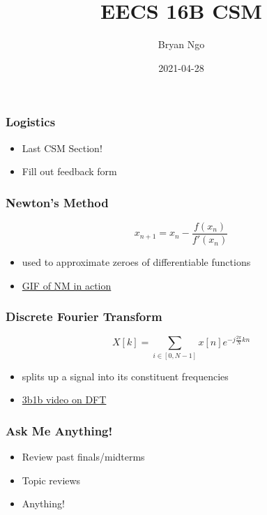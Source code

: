 \documentclass[aspectratio=169]{beamer}
\title{EECS 16B CSM}
\author{Bryan Ngo}
\date{2021-04-28}
\institute{UC Berkeley}
\begin{document}
\begin{frame}
    \maketitle
\end{frame}

\begin{frame}
    \frametitle{Logistics}

    \begin{itemize}
        \item Last CSM Section!
        \item Fill out feedback form
    \end{itemize}
\end{frame}

\begin{frame}
    \frametitle{Newton's Method}

    \begin{equation}
        x_{n + 1} = x_n - \frac{f(x_n)}{f'(x_n)}
    \end{equation}
    \begin{itemize}
        \item used to approximate zeroes of differentiable functions
        \item \href{https://upload.wikimedia.org/wikipedia/commons/e/e0/NewtonIteration_Ani.gif}{GIF of NM in action}
    \end{itemize}
\end{frame}

\begin{frame}
    \frametitle{Discrete Fourier Transform}

    \begin{equation}
        X[k] = \sum_{i \in [0, N - 1]} x[n] e^{-j \frac{2\pi}{N} k n}
    \end{equation}
    \begin{itemize}
        \item splits up a signal into its constituent frequencies
        \item \href{https://youtu.be/g8RkArhtCc4}{3b1b video on DFT}
    \end{itemize}
\end{frame}

\begin{frame}
    \frametitle{Ask Me Anything!}

    \begin{itemize}
        \item Review past finals/midterms
        \item Topic reviews
        \item Anything!
    \end{itemize}
\end{frame}
\end{document}

